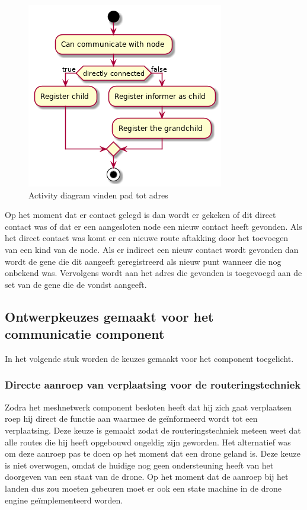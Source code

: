 \documentclass[a4paper, 11pt, oneside]{report}
\begin{document}
\begin{figure}[H]
	\begin{center}\includegraphics[width=.45\linewidth]{UML/out/Communication/activity/contactgevonden/contactgevonden.png}\end{center}
	\caption{Activity diagram vinden pad tot adres}
	\label{fig:communication:routeringtechniek:gevonde}
\end{figure}

Op het moment dat er contact gelegd is dan wordt er gekeken of dit direct contact was of dat er een aangesloten node een nieuw contact heeft gevonden. Als het direct contact was komt er een nieuwe route aftakking door het toevoegen van een kind van de node.
Als er indirect een nieuw contact wordt gevonden dan wordt de gene die dit aangeeft geregistreerd als nieuw punt wanneer die nog onbekend was. Vervolgens wordt aan het adres die gevonden is toegevoegd aan de set van de gene die de vondst aangeeft.

\subsection{Ontwerpkeuzes gemaakt voor het communicatie component}
\label{DetailedDesign:Communicatie:ontwerkeuzes}
In het volgende stuk worden de keuzes gemaakt voor het component toegelicht.

\subsubsection{Directe aanroep van verplaatsing voor de routeringstechniek}

Zodra het meshnetwerk component besloten heeft dat hij zich gaat verplaatsen roep hij direct de functie aan waarmee de  geïnformeerd wordt tot een verplaatsing.
Deze keuze is gemaakt zodat de routeringstechniek meteen weet dat alle routes die hij heeft opgebouwd ongeldig zijn geworden.
Het alternatief was om deze aanroep pas te doen op het moment dat een drone geland is.
Deze keuze is niet overwogen, omdat de huidige  nog geen ondersteuning heeft van het doorgeven van een staat van de drone.
Op het moment dat de aanroep bij het landen dus zou moeten gebeuren moet er ook een state machine in de drone engine geïmplementeerd worden. 
 
\end{document}

